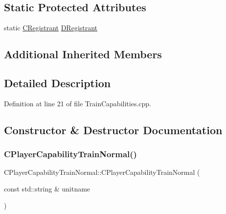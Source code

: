 \subsection*{Static Protected Attributes}
\begin{DoxyCompactItemize}
\item 
static \hyperlink{classCPlayerCapabilityTrainNormal_1_1CRegistrant}{C\+Registrant} \hyperlink{classCPlayerCapabilityTrainNormal_a20934470ff6a9ba1cba5969dba8102e4}{D\+Registrant}
\end{DoxyCompactItemize}
\subsection*{Additional Inherited Members}


\subsection{Detailed Description}


Definition at line 21 of file Train\+Capabilities.\+cpp.



\subsection{Constructor \& Destructor Documentation}
\hypertarget{classCPlayerCapabilityTrainNormal_a80b62a5131937c8230bf6229626dc53c}{}\label{classCPlayerCapabilityTrainNormal_a80b62a5131937c8230bf6229626dc53c} 
\subsubsection{\texorpdfstring{C\+Player\+Capability\+Train\+Normal()}{CPlayerCapabilityTrainNormal()}}
{\footnotesize\ttfamily C\+Player\+Capability\+Train\+Normal\+::\+C\+Player\+Capability\+Train\+Normal (\begin{DoxyParamCaption}\item[{const std\+::string \&}]{unitname }\end{DoxyParamCaption})\hspace{0.3cm}{\ttfamily [protected]}}



